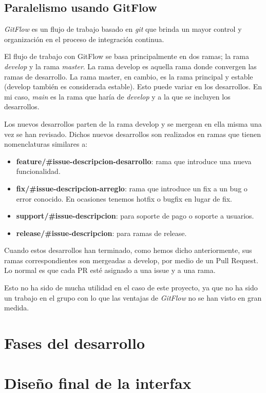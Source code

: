 \subsection{Paralelismo usando GitFlow}

\textit{GitFlow} es un flujo de trabajo basado en \textit{git} que brinda un mayor control y organización en el proceso de integración continua.\newline

El flujo de trabajo con GitFlow se basa principalmente en dos ramas; la rama \textit{develop} y la rama \textit{master}. La rama develop es aquella rama donde convergen las ramas de desarrollo. La rama master, en cambio, es la rama principal y estable (develop también es considerada estable). Esto puede variar en los desarrollos. En mi caso, \textit{main} es la rama que haría de \textit{develop} y a la que se incluyen los desarrollos.\newline

Los nuevos desarrollos parten de la rama develop y se mergean en ella misma una vez se han revisado. Dichos nuevos desarrollos son realizados en ramas que tienen nomenclaturas similares a:\newline

\begin{itemize}
	\item \textbf{feature/\#issue-descripcion-desarrollo}: rama que introduce una nueva funcionalidad.
	\item \textbf{fix/\#issue-descripcion-arreglo}: rama que introduce un fix a un bug o error conocido. En ocasiones tenemos hotfix o bugfix en lugar de fix.
	\item \textbf{support/\#issue-descripcion}: para soporte de pago o soporte a usuarios.
	\item \textbf{release/\#issue-descripcion}: para ramas de release.
\end{itemize}	

Cuando estos desarrollos han terminado, como hemos dicho anteriormente, sus ramas correspondientes son mergeadas a develop, por medio de un Pull Request. Lo normal es que cada PR esté asignado a una issue y a una rama.
\newline

Esto no ha sido de mucha utilidad en el caso de este proyecto, ya que no ha sido un trabajo en el grupo con lo que las ventajas de \textit{GitFlow} no se han visto en gran medida. \newline

\section{Fases del desarrollo}


\section{Diseño final de la interfax}


